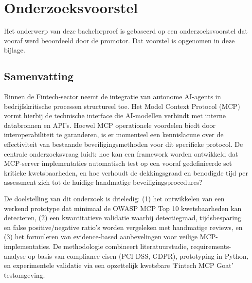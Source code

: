 \documentclass[dutch,dit,thesis]{hogentreport}
\begin{document}












\appendix

\chapter{Onderzoeksvoorstel}

Het onderwerp van deze bachelorproef is gebaseerd op een onderzoeksvoorstel dat vooraf werd beoordeeld door de promotor. Dat voorstel is opgenomen in deze bijlage.

\section*{Samenvatting}

Binnen de Fintech-sector neemt de integratie van autonome AI-agents in bedrijfskritische processen structureel toe. Het Model Context Protocol (MCP) vormt hierbij de technische interface die AI-modellen verbindt met interne databronnen en API's. Hoewel MCP operationele voordelen biedt door interoperabiliteit te garanderen, is er momenteel een kennislacune over de effectiviteit van bestaande beveiligingsmethoden voor dit specifieke protocol. De centrale onderzoeksvraag luidt: hoe kan een framework worden ontwikkeld dat MCP-server implementaties automatisch test op een vooraf gedefinieerde set kritieke kwetsbaarheden, en hoe verhoudt de dekkingsgraad en benodigde tijd per assessment zich tot de huidige handmatige beveiligingsprocedures?
    
De doelstelling van dit onderzoek is drieledig: (1) het ontwikkelen van een werkend prototype dat minimaal de OWASP MCP Top 10 kwetsbaarheden kan detecteren, (2) een kwantitatieve validatie waarbij detectiegraad, tijdsbesparing en false positive/negative ratio's worden vergeleken met handmatige reviews, en (3) het formuleren van evidence-based aanbevelingen voor veilige MCP-implementaties. De methodologie combineert literatuurstudie, requirements-analyse op basis van compliance-eisen (PCI-DSS, GDPR), prototyping in Python, en experimentele validatie via een opzettelijk kwetsbare 'Fintech MCP Goat' testomgeving.
    
\end{document}
